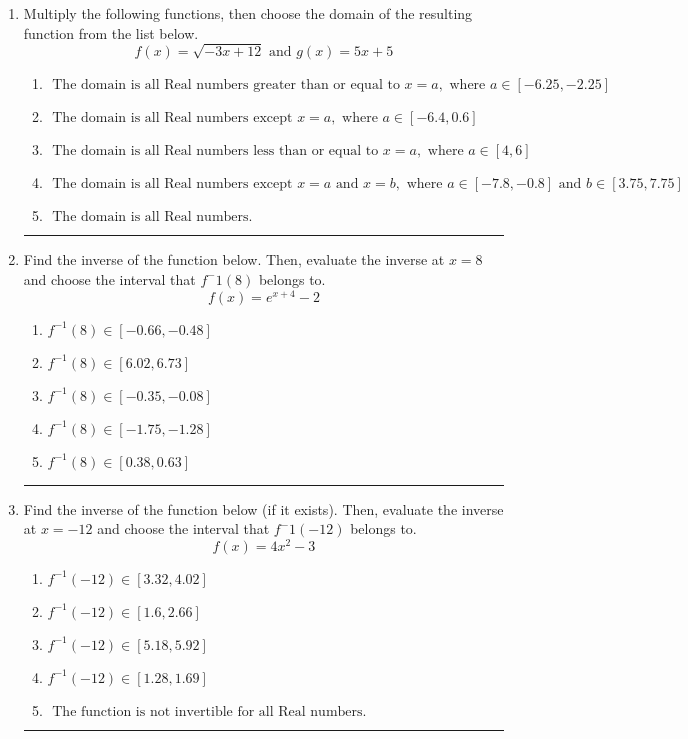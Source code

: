 \documentclass[14pt]{extbook}
\newcommand{\litem}[1]{\item#1\hspace*{-1cm}\rule{\textwidth}{0.4pt}}
\begin{document}
\begin{enumerate}
{\begin{enumerate}[label=\Alph*.]
\end{enumerate} }
\litem{
Multiply the following functions, then choose the domain of the resulting function from the list below.\[ f(x) = \sqrt{-3x+12}  \text{ and } g(x) = 5x + 5 \]\begin{enumerate}[label=\Alph*.]
\item \( \text{ The domain is all Real numbers greater than or equal to } x = a, \text{ where } a \in [-6.25, -2.25] \)
\item \( \text{ The domain is all Real numbers except } x = a, \text{ where } a \in [-6.4, 0.6] \)
\item \( \text{ The domain is all Real numbers less than or equal to } x = a, \text{ where } a \in [4, 6] \)
\item \( \text{ The domain is all Real numbers except } x = a \text{ and } x = b, \text{ where } a \in [-7.8, -0.8] \text{ and } b \in [3.75, 7.75] \)
\item \( \text{ The domain is all Real numbers. } \)

\end{enumerate} }
\litem{
Find the inverse of the function below. Then, evaluate the inverse at $x = 8$ and choose the interval that $f^-1(8)$ belongs to.\[ f(x) = e^{x+4}-2 \]\begin{enumerate}[label=\Alph*.]
\item \( f^{-1}(8) \in [-0.66, -0.48] \)
\item \( f^{-1}(8) \in [6.02, 6.73] \)
\item \( f^{-1}(8) \in [-0.35, -0.08] \)
\item \( f^{-1}(8) \in [-1.75, -1.28] \)
\item \( f^{-1}(8) \in [0.38, 0.63] \)

\end{enumerate} }
\litem{
Find the inverse of the function below (if it exists). Then, evaluate the inverse at $x = -12$ and choose the interval that $f^-1(-12)$ belongs to.\[ f(x) = 4 x^2 - 3 \]\begin{enumerate}[label=\Alph*.]
\item \( f^{-1}(-12) \in [3.32, 4.02] \)
\item \( f^{-1}(-12) \in [1.6, 2.66] \)
\item \( f^{-1}(-12) \in [5.18, 5.92] \)
\item \( f^{-1}(-12) \in [1.28, 1.69] \)
\item \( \text{ The function is not invertible for all Real numbers. } \)


\end{enumerate}}
\end{enumerate}
\end{document}
